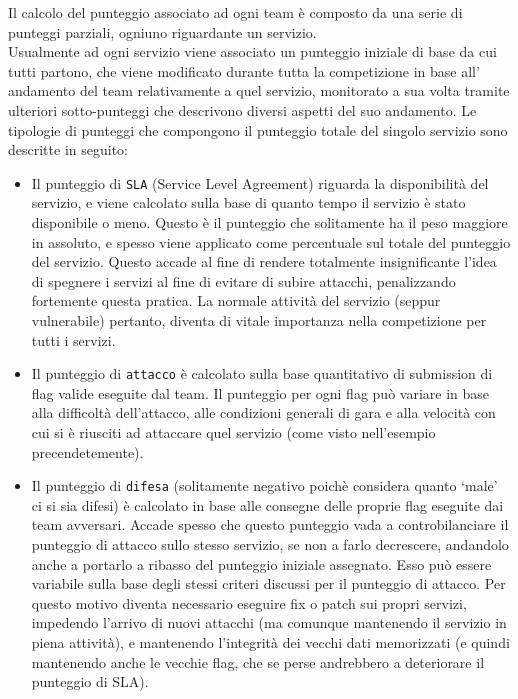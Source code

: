Il calcolo del punteggio associato ad ogni team è composto da una serie di punteggi parziali, ogniuno riguardante un servizio.\\
Usualmente ad ogni servizio viene associato un punteggio iniziale di base da cui tutti partono, che viene modificato durante tutta la competizione in base all'
andamento del team relativamente a quel servizio, monitorato a sua volta tramite ulteriori sotto-punteggi che descrivono diversi aspetti del suo andamento.
Le tipologie di punteggi che compongono il punteggio totale del singolo servizio sono descritte in seguito:
\begin{itemize}
    \setlength{\itemsep}{5pt}
    \setlength{\parskip}{5pt}
    \item Il punteggio di \texttt{SLA} (Service Level Agreement) riguarda la disponibilità del servizio, e viene calcolato sulla base di quanto tempo il servizio è stato disponibile o meno.
    Questo è il punteggio che solitamente ha il peso maggiore in assoluto, e spesso viene applicato come percentuale sul totale del punteggio del servizio. Questo accade al fine di
    rendere totalmente insignificante l'idea di spegnere i servizi al fine di evitare di subire attacchi, penalizzando fortemente questa pratica.
    La normale attività del servizio (seppur vulnerabile) pertanto, diventa di vitale importanza nella competizione per tutti i servizi.
    \item Il punteggio di \texttt{attacco} è calcolato sulla base quantitativo di submission di flag valide eseguite dal team. Il punteggio per ogni flag può variare in base alla difficoltà dell'attacco,
    alle condizioni generali di gara e alla velocità con cui si è riusciti ad attaccare quel servizio (come visto nell'esempio precendetemente).
    \item Il punteggio di \texttt{difesa} (solitamente negativo poichè considera quanto `male' ci si sia difesi) è calcolato in base alle consegne
    delle proprie flag eseguite dai team avversari. Accade spesso che questo punteggio vada a controbilanciare il punteggio di attacco sullo stesso servizio, se non a farlo decrescere, andandolo anche a
    portarlo a ribasso del punteggio iniziale assegnato. Esso può essere variabile sulla base degli stessi criteri discussi per il punteggio di attacco. Per questo motivo diventa necessario eseguire
    fix o patch sui propri servizi, impedendo l'arrivo di nuovi attacchi (ma comunque mantenendo il servizio in piena attività),
    e mantenendo l'integrità dei vecchi dati memorizzati (e quindi mantenendo anche le vecchie flag, che se perse andrebbero a deteriorare il punteggio di SLA).
\end{itemize}

